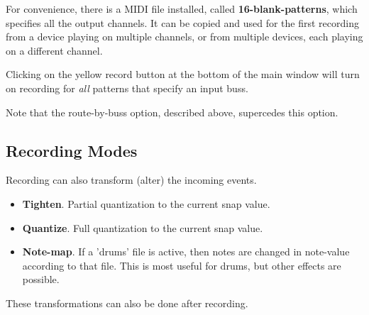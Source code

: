    For convenience, there is a MIDI file installed, called
   \textbf{16-blank-patterns}, which specifies all the output channels.
   It can be copied and used for the first recording from a device
   playing on multiple channels, or from multiple devices, each playing
   on a different channel.

   Clicking on the yellow record button at the bottom of the main window
   will turn on recording for \textsl{all}
   patterns that specify an input buss.

   Note that the route-by-buss option, described above, supercedes this
   option.

\subsection{Recording Modes}
\label{sec:recording_modes}

   Recording can also transform (alter) the incoming events.

   \begin{itemize}
      \item \textbf{Tighten}.
         Partial quantization to the current snap value.
      \item \textbf{Quantize}.
         Full quantization to the current snap value.
      \item \textbf{Note-map}.
         If a 'drums' file is active, then notes are changed
         in note-value according to that file.
         This is most useful for drums, but other effects are possible.
   \end{itemize}

   These transformations can also be done after recording.

